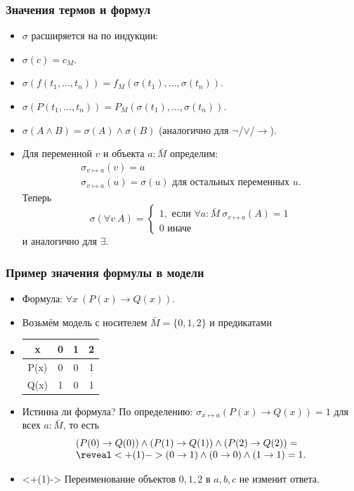 \documentclass[10pt]{beamer}
\begin{document}
\begin{frame}
    \frametitle{Значения термов и формул}
    \begin{itemize}
        \item $\sigma$ расширяется на  по индукции: \pause 
        \item $\sigma(c) = c_M$.
        \item $\sigma(f(t_1,\ldots,t_n)) = f_M(\sigma(t_1),\ldots,\sigma(t_n))$.
        \pause
        \item $\sigma(P(t_1,\ldots,t_n)) = P_M(\sigma(t_1),\ldots,\sigma(t_n))$.
        \item $\sigma(A \land B) = \sigma(A) \land \sigma(B)$ (аналогично для $\neg$/$\lor$/$\to$).
        \pause
        \item Для переменной $v$ и объекта $a:\bar M$ определим:
        \[ \begin{array}{l}
            \sigma_{v \mapsto a}(v) = a \\
            \sigma_{v \mapsto a}(u) = \sigma(u) \text{ для остальных переменных } u.
        \end{array} \]
        \pause
        Теперь
        \[ \sigma(\forall v ~ A) = \left\{ \begin{array}{l}
            1, \text{ если } \forall a : \bar{M} ~  \sigma_{v \mapsto a}(A) = 1 \\
            0 \text{ иначе }
        \end{array} \right. \]
        и аналогично для $\exists$.
    \end{itemize}
\end{frame}

\begin{frame}
    \frametitle{Пример значения формулы в модели}
    \begin{itemize}
        \item Формула: $\forall x ~ (P(x) \to Q(x))$.
        \item Возьмём модель с носителем $\bar{M} = \{0,1,2\}$ и предикатами \pause
        \item[] \begin{tabular}{c | c c c}
            x & 0 & 1 & 2 \\ \hline
            P(x) & 0 & 0 & 1 \\
            Q(x) & 1 & 0 & 1
        \end{tabular}
        \item Истинна ли формула? \pause По определению: $\sigma_{x \mapsto a}(P(x) \to Q(x)) = 1$ для всех $a : \bar{M}$, то есть
        \[ \begin{array}{l}
            (P(0) \to Q(0)) \land (P(1) \to Q(1)) \land (P(2) \to Q(2)) = \\
            \reveal<+(1)->{(0 \to 1) \land (0 \to 0) \land (1 \to 1) = 1.}
        \end{array} \]
        \item<+(1)-> Переименование объектов $0,1,2$ в $a,b,c$ не изменит ответа.
    \end{itemize}
\end{frame}
\end{document}
